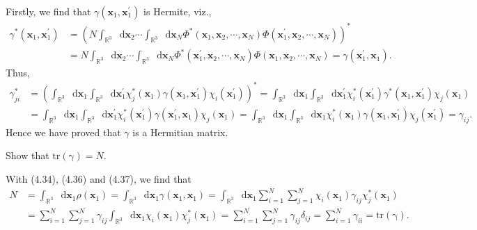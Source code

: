 \documentclass[a4paper]{book}
\newcounter{exercise}[chapter]
\newcounter{solution}[chapter]
\newcommand\tr[1]{\mathrm{tr(#1)}}
\newcommand*{\dif}{\mathop{}\!\mathrm{d}}
\begin{document}
	\begin{solution}
	Firstly, we find that $\gamma( \boldsymbol{x}_1 , \boldsymbol{x}^\prime_1 )$ is Hermite, viz.,
	\begin{align*}
		\gamma^*( \boldsymbol{x}_1 , \boldsymbol{x}^\prime_1 ) &= \left( N \int_{\mathbb{R}^3} \dif \boldsymbol{x}_2 \cdots \int_{\mathbb{R}^3} \dif \boldsymbol{x}_N \Phi^*( \boldsymbol{x}_1 , \boldsymbol{x}_2 , \cdots , \boldsymbol{x}_N ) \Phi( \boldsymbol{x}^\prime_1 , \boldsymbol{x}_2 , \cdots , \boldsymbol{x}_N ) \right)^* \\
		&= N \int_{\mathbb{R}^3} \dif \boldsymbol{x}_2 \cdots \int_{\mathbb{R}^3} \dif \boldsymbol{x}_N \Phi^*( \boldsymbol{x}^\prime_1 , \boldsymbol{x}_2 , \cdots , \boldsymbol{x}_N ) \Phi( \boldsymbol{x}_1 , \boldsymbol{x}_2 , \cdots , \boldsymbol{x}_N ) = \gamma( \boldsymbol{x}^\prime_1 , \boldsymbol{x}_1 ).
	\end{align*}
	Thus,
	\begin{align*}
		\gamma^*_{ji} &= \left( \int_{\mathbb{R}^3} \dif \boldsymbol{x}_1 \int_{\mathbb{R}^3} \dif \boldsymbol{x}^\prime_1 \chi^*_j( \boldsymbol{x}_1 ) \gamma( \boldsymbol{x}_1 , \boldsymbol{x}^\prime_1 ) \chi_i( \boldsymbol{x}^\prime_1 ) \right)^* = \int_{\mathbb{R}^3} \dif \boldsymbol{x}_1 \int_{\mathbb{R}^3} \dif \boldsymbol{x}^\prime_1 \chi^*_i( \boldsymbol{x}^\prime_1 ) \gamma^*( \boldsymbol{x}_1 , \boldsymbol{x}^\prime_1 ) \chi_j( \boldsymbol{x}_1 ) \\
		&= \int_{\mathbb{R}^3} \dif \boldsymbol{x}_1 \int_{\mathbb{R}^3} \dif \boldsymbol{x}^\prime_1 \chi^*_i( \boldsymbol{x}^\prime_1 ) \gamma( \boldsymbol{x}^\prime_1 , \boldsymbol{x}_1 ) \chi_j( \boldsymbol{x}_1 ) = \int_{\mathbb{R}^3} \dif \boldsymbol{x}_1 \int_{\mathbb{R}^3} \dif \boldsymbol{x}_1 \chi^*_i( \boldsymbol{x}_1 ) \gamma( \boldsymbol{x}_1 , \boldsymbol{x}^\prime_1 ) \chi_j( \boldsymbol{x}^\prime_1 ) = \gamma_{ij}.
	\end{align*}
	Hence we have proved that $\gamma$ is a Hermitian matrix.
	
	\end{solution}	
	
	\begin{exercise}
	Show that $\tr{\gamma}=N$.
	\end{exercise}
	
	\begin{solution}
	With (4.34), (4.36) and (4.37), we find that
	\begin{align*}
		N &= \int_{ \mathbb{R}^3 } \dif \boldsymbol{x}_1 \rho( \boldsymbol{x}_1 ) = \int_{ \mathbb{R}^3 } \dif \boldsymbol{x}_1 \gamma( \boldsymbol{x}_1 , \boldsymbol{x}_1  ) = \int_{ \mathbb{R}^3 } \dif \boldsymbol{x}_1 \sum_{ i=1 }^N \sum_{ j=1 }^N \chi_i( \boldsymbol{x}_1 ) \gamma_{ij} \chi^*_j( \boldsymbol{x}_1 ) \\
		&= \sum_{ i=1 }^N \sum_{ j=1 }^N \gamma_{ij} \int_{ \mathbb{R}^3 } \dif \boldsymbol{x}_1 \chi_i( \boldsymbol{x}_1 )  \chi^*_j( \boldsymbol{x}_1 ) = \sum_{ i=1 }^N \sum_{ j=1 }^N \gamma_{ij} \delta_{ij} = \sum_{ i=1 }^N \gamma_{ii} = \tr\gamma.
	\end{align*}
	
	\end{solution}
	
\end{document}
